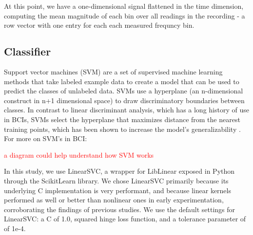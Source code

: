 



At this point, we have a one-dimensional signal flattened in the time dimension, computing the mean magnitude of each bin over all readings in the recording - a row vector with one entry for each each measured frequncy bin. 

\subsection{Classifier}

Support vector machines (SVM) are a set of supervised machine learning methods that take labeled example data to create a model that can be used to predict the classes of unlabeled data. SVMs use a hyperplane (an n-dimensional construct in n+1 dimensional space) to draw discriminatory boundaries between classes. In contrast to linear discriminant analysis, which has a long history of use in BCIs, SVMs select the hyperplane that maximizes distance from the nearest training points, which has been shown to increase the model's generalizability \cite{burges_tutorial_1998}.  For more on SVM's in BCI: \cite{garrett_comparison_2003,grierson_better_2011} 

\textcolor{red}{a diagram could help understand how SVM works}

In this study, we use LinearSVC, \cite{fan_liblinear:_2008} a wrapper for LibLinear exposed in Python through the ScikitLearn library. \cite{pedregosa_scikit-learn:_2011} We chose LinearSVC primarily because its underlying C implementation is very performant, and because linear kernels performed as well or better than nonlinear ones in early experimentation, corroborating the findings of previous studies. \cite{garrett_comparison_2003,lotte_review_2007}  We use the default settings for LinearSVC: a C of 1.0, squared hinge loss function, and a tolerance parameter of of 1e-4. 

